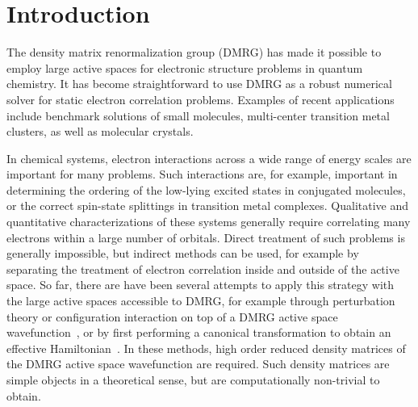 
\section{Introduction}

The density matrix renormalization group (DMRG) \cite{white_density_1992,white_density-matrix_1993} has made it possible to employ large active spaces 
for electronic structure problems in quantum chemistry. It has become straightforward to use DMRG as a robust numerical solver for 
static electron correlation problems. Examples of recent applications include benchmark solutions of small molecules\cite{chan_highly_2002}, multi-center transition metal clusters\cite{sharma_low-energy_2014, olivares-amaya_ab-initio_2015}, as well as molecular crystals\cite{yang_ab_2014}. 

In chemical systems, electron interactions across a wide range of energy scales are important for many problems. Such interactions are, for example, 
important in determining the ordering of the low-lying excited states 
in conjugated molecules, or the correct spin-state splittings in transition metal complexes. Qualitative and quantitative characterizations of 
these systems generally require correlating many electrons within a large number of orbitals. Direct treatment of such problems is generally 
impossible, but indirect methods can be used, for example by separating the treatment of electron correlation inside and outside of the active space. 
So far, there are have been several attempts to apply this strategy with the large active spaces accessible to DMRG, for example
through perturbation theory or configuration interaction on top of a DMRG active space
wavefunction~\cite{kurashige_second-order_2011, sharma_communication:_2014}, or by first performing a canonical transformation to obtain an effective Hamiltonian~\cite{neuscammanreview_2010}.
In these methods, high order reduced density matrices of the DMRG active space wavefunction are required. Such density matrices 
are simple objects in a theoretical sense, but are computationally non-trivial to obtain.

